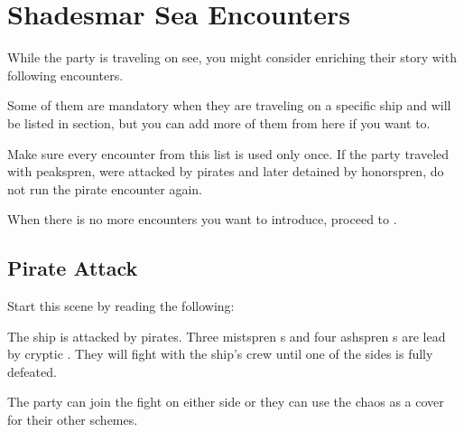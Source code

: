 \section{Shadesmar Sea Encounters}
\label{sec:shadesmarSeaEncounters}

While the party is traveling on see, you might consider enriching their story with following encounters. 

Some of them are mandatory when they are traveling on a specific ship and will be listed in  section, but you can add more of them from here if you want to.

Make sure every encounter from this list is used only once. If the party traveled with peakspren, were attacked by pirates and later detained by honorspren, do not run the pirate encounter again.

When there is no more encounters you want to introduce, proceed to . 




\subsection{Pirate Attack}
\label{ssec:shadesmarSeaEncountersPirates}

Start this scene by reading the following:


The ship is attacked by pirates. Three mistspren \enemyMandraRider{}s and four ashspren \enemySprenPirate{}s are lead by cryptic \enemySprenCaptain{}. They will fight with the ship's crew until one of the sides is fully defeated.

The party can join the fight on either side or they can use the chaos as a cover for their other schemes.





